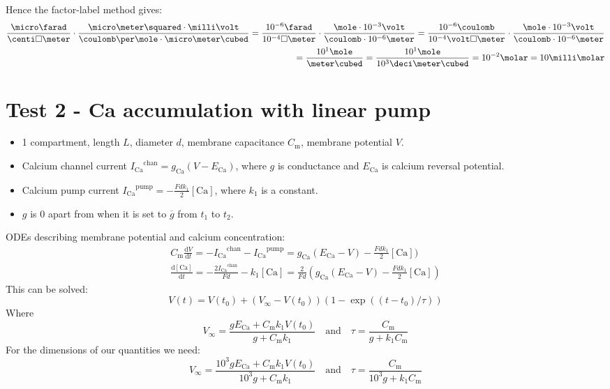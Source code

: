 \documentclass{article}
\newcommand{\ICa}{\ensuremath{I_\mathrm{Ca}}\xspace}
\newcommand{\gCa}{\ensuremath{g_\mathrm{Ca}}\xspace}
\newcommand{\ECa}{\ensuremath{E_\mathrm{Ca}}\xspace}
\newcommand{\Cmem}{\ensuremath{C_\mathrm{m}}\xspace}
\newcommand{\dif}{\textrm{d}}
\newcommand{\cCa}{[\textrm{Ca}]}
\begin{document}
Hence the factor-label method gives: 
\begin{equation}
  \begin{split}
  \frac{\micro\farad}{\centi\square\meter}\cdot\frac{\micro\meter\squared\cdot\milli\volt}%
  {\coulomb\per\mole\cdot\micro\meter\cubed}
  = \frac{10^{-6} \farad}{10^{-4}\square\meter}\cdot\frac{\mole\cdot10^{-3}\volt}%
  {\coulomb\cdot10^{-6}\meter}
  = \frac{10^{-6} \coulomb}{10^{-4}\volt\square\meter}\cdot\frac{\mole\cdot10^{-3}\volt}%
  {\coulomb\cdot10^{-6}\meter}\\
  = \frac{10^1\mole}{\meter\cubed} =
  \frac{10^1\mole}{10^3\deci\meter\cubed} = 10^{-2}\molar = 10\milli\molar
  \end{split}
\end{equation}
  
\clearpage
\section{Test 2  - Ca accumulation with linear pump}
\label{tests:sec:test-1-ca}

\begin{itemize}
\item 1 compartment, length $L$, diameter $d$, membrane capacitance
  \Cmem, membrane potential $V$.
\item Calcium channel current $\ICa^\mathrm{chan}=\gCa(V-\ECa)$, where $g$ is conductance
  and $\ECa$ is calcium reversal potential.
\item Calcium pump current $\ICa^\mathrm{pump}=- \frac{Fdk_1}{2}\cCa$,
  where $k_1$ is a constant.
\item $g$ is 0 apart from when it is set to $\overline{g}$ from $t_1$
  to $t_2$.
\end{itemize}

ODEs describing membrane potential and calcium concentration:
\begin{equation}
  \begin{split}
    \Cmem\frac{\dif V}{\dif t} = -\ICa^\mathrm{chan} - \ICa^\mathrm{pump} = \gCa(\ECa - V) - \frac{Fdk_1}{2}\cCa ) \\
    \frac{\dif\cCa}{\dif t} = -\frac{2\ICa^\mathrm{chan}}{Fd} - k_1\cCa =
    \frac{2}{Fd} \left(\gCa(\ECa - V) - \frac{Fdk_1}{2}\cCa \right)
  \end{split}
\end{equation}
 This can be solved:
\begin{equation}
  \label{tests:eq:2}
  V(t) = V(t_0) + (V_\infty - V(t_0))(1-\exp((t-t_0)/\tau))
\end{equation}
Where 
\begin{equation}
  \label{tests:eq:5}
  V_\infty = \frac{g\ECa + \Cmem k_1 V(t_0)}{g + \Cmem k_1} \quad
  \mbox{and} \quad \tau = \frac{\Cmem}{g + k_1\Cmem}
\end{equation}
For the dimensions of our quantities we need:
\begin{equation}
  \label{tests:eq:5}
  V_\infty = \frac{10^3g\ECa + \Cmem k_1 V(t_0)}{10^3g + \Cmem k_1} \quad
  \mbox{and} \quad \tau = \frac{\Cmem}{10^3g + k_1\Cmem}
\end{equation}
\end{document}
